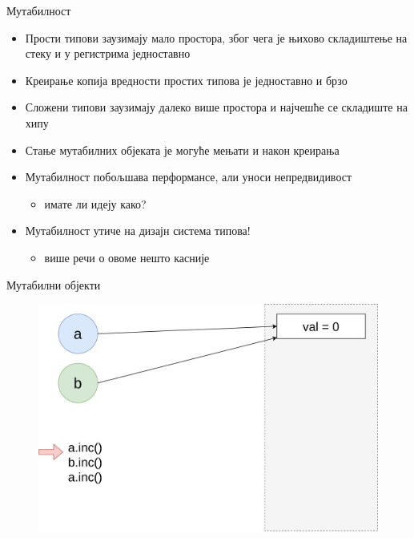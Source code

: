 \documentclass[xcolor=table]{beamer}
\begin{document}
\begin{frame}[allowframebreaks]{Мутабилност}
        \begin{itemize}
            \item Прости типови заузимају мало простора, због чега је њихово складиштење на стеку и у регистрима једноставно
            \item Креирање копија вредности простих типова је једноставно и брзо
            \item Сложени типови заузимају далеко више простора и најчешће се складиште на хипу
            \item Стање мутабилних објеката је могуће мењати и након креирања
            \item Мутабилност побољшава перформансе, али уноси непредвидивост
            \begin{itemize}
                \item имате ли идеју како?
            \end{itemize}
            \item Мутабилност утиче на дизајн система типова!
            \begin{itemize}
                \item више речи о овоме нешто касније
            \end{itemize}
        \end{itemize}
    \end{frame}
    
    \begin{frame}{Мутабилни објекти}
        \begin{figure}
            \centering
            \includegraphics[height=0.7\textheight,keepaspectratio]{images/mut0.png}
        \end{figure}
    \end{frame}
    
\end{document}
